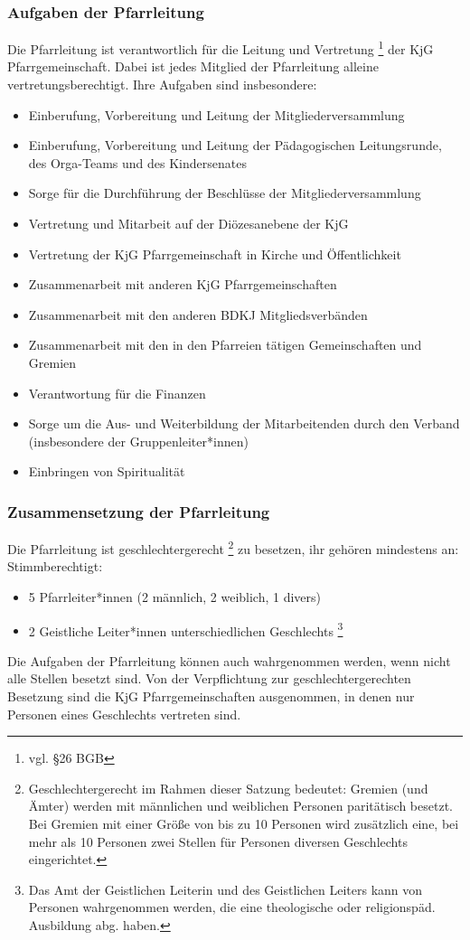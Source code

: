 \documentclass[12pt]{report}
\newcommand{\footnoteremember}[2]{
  \footnote{#2}
  \newcounter{#1}
  \setcounter{#1}{\value{footnote}}
}
\begin{document}
\begin{flushleft}
\subsubsection{Aufgaben der Pfarrleitung}
Die Pfarrleitung ist verantwortlich für die Leitung und Vertretung \footnote{ vgl. §26 BGB} der KjG Pfarrgemeinschaft.
Dabei ist jedes Mitglied der Pfarrleitung alleine vertretungsberechtigt.
Ihre Aufgaben sind insbesondere:
\begin{itemize}
  \item Einberufung, Vorbereitung und Leitung der Mitgliederversammlung
  \item Einberufung, Vorbereitung und Leitung der Pädagogischen Leitungsrunde, des Orga-Teams und des Kindersenates
  \item Sorge für die Durchführung der Beschlüsse der Mitgliederversammlung
  \item Vertretung und Mitarbeit auf der Diözesanebene der KjG
  \item Vertretung der KjG Pfarrgemeinschaft in Kirche und Öffentlichkeit
  \item Zusammenarbeit mit anderen KjG Pfarrgemeinschaften
  \item Zusammenarbeit mit den anderen BDKJ Mitgliedsverbänden
  \item Zusammenarbeit mit den in den Pfarreien tätigen Gemeinschaften und Gremien
  \item Verantwortung für die Finanzen
  \item Sorge um die Aus- und Weiterbildung der Mitarbeitenden durch den Verband (insbesondere der Gruppenleiter*innen)
  \item Einbringen von Spiritualität
\end{itemize}

\subsubsection{Zusammensetzung der Pfarrleitung}

Die Pfarrleitung ist geschlechtergerecht\footnoteremember{geschlechtergerecht}{Geschlechtergerecht im Rahmen dieser Satzung bedeutet: Gremien (und Ämter) werden mit männlichen und
weiblichen Personen paritätisch besetzt. Bei Gremien mit einer Größe von bis zu 10 Personen wird zusätzlich
eine, bei mehr als 10 Personen zwei Stellen für Personen diversen Geschlechts eingerichtet.} zu besetzen, ihr gehören mindestens an:
Stimmberechtigt:
\begin{itemize}
  \item 5 Pfarrleiter*innen (2 männlich, 2 weiblich, 1 divers)
  \item {2 Geistliche Leiter*innen unterschiedlichen Geschlechts\footnoteremember{Berechtigung Geist}{
    Das Amt der Geistlichen Leiterin und des Geistlichen Leiters kann von Personen wahrgenommen werden,
    die eine theologische oder religionspäd. Ausbildung abg. haben.
  }}
\end{itemize}
Die Aufgaben der Pfarrleitung können auch wahrgenommen werden, wenn nicht alle Stellen besetzt sind.
 Von der Verpflichtung zur geschlechtergerechten Besetzung sind die KjG Pfarrgemeinschaften ausgenommen, in
denen nur Personen eines Geschlechts vertreten sind.


\end{flushleft}
\end{document}
